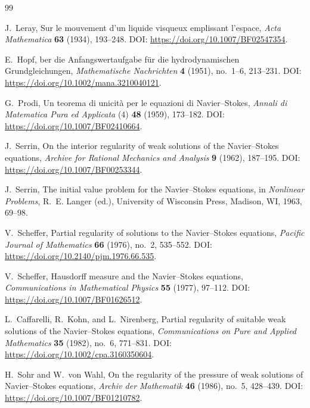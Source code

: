 \documentclass[11pt]{article}
\numberwithin{equation}{section}
\theoremstyle{plain}
\theoremstyle{definition}
\theoremstyle{remark}
\begin{document}
\begin{thebibliography}{99}

J.~Leray,
\newblock Sur le mouvement d'un liquide visqueux emplissant l'espace,
\newblock \emph{Acta Mathematica} \textbf{63} (1934), 193--248.
\newblock DOI: \url{https://doi.org/10.1007/BF02547354}.

E.~Hopf,
ber die Anfangswertaufgabe f{\"u}r die hydrodynamischen Grundgleichungen,
\newblock \emph{Mathematische Nachrichten} \textbf{4} (1951), no.~1--6, 213--231.
\newblock DOI: \url{https://doi.org/10.1002/mana.3210040121}.

G.~Prodi,
\newblock Un teorema di unicit\`a per le equazioni di Navier--Stokes,
\newblock \emph{Annali di Matematica Pura ed Applicata} (4) \textbf{48} (1959), 173--182.
\newblock DOI: \url{https://doi.org/10.1007/BF02410664}.

J.~Serrin,
\newblock On the interior regularity of weak solutions of the Navier--Stokes equations,
\newblock \emph{Archive for Rational Mechanics and Analysis} \textbf{9} (1962), 187--195.
\newblock DOI: \url{https://doi.org/10.1007/BF00253344}.

J.~Serrin,
\newblock The initial value problem for the Navier--Stokes equations,
\newblock in \emph{Nonlinear Problems}, R.~E. Langer (ed.), University of Wisconsin Press, Madison, WI, 1963, 69--98.

V.~Scheffer,
\newblock Partial regularity of solutions to the Navier--Stokes equations,
\newblock \emph{Pacific Journal of Mathematics} \textbf{66} (1976), no.~2, 535--552.
\newblock DOI: \url{https://doi.org/10.2140/pjm.1976.66.535}.

V.~Scheffer,
\newblock Hausdorff measure and the Navier--Stokes equations,
\newblock \emph{Communications in Mathematical Physics} \textbf{55} (1977), 97--112.
\newblock DOI: \url{https://doi.org/10.1007/BF01626512}.

L.~Caffarelli, R.~Kohn, and L.~Nirenberg,
\newblock Partial regularity of suitable weak solutions of the Navier--Stokes equations,
\newblock \emph{Communications on Pure and Applied Mathematics} \textbf{35} (1982), no.~6, 771--831.
\newblock DOI: \url{https://doi.org/10.1002/cpa.3160350604}.

H.~Sohr and W.~von Wahl,
\newblock On the regularity of the pressure of weak solutions of Navier--Stokes equations,
\newblock \emph{Archiv der Mathematik} \textbf{46} (1986), no.~5, 428--439.
\newblock DOI: \url{https://doi.org/10.1007/BF01210782}.


\end{thebibliography}
\end{document}
